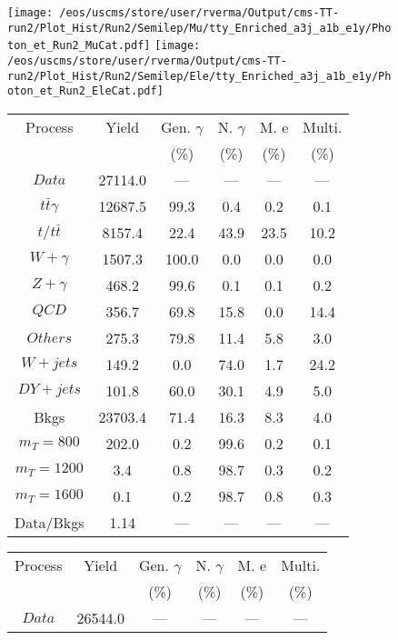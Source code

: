\begin{figure}
\centering
\texttt{[image: /eos/uscms/store/user/rverma/Output/cms-TT-run2/Plot\_Hist/Run2/Semilep/Mu/tty\_Enriched\_a3j\_a1b\_e1y/Photon\_et\_Run2\_MuCat.pdf]}
\texttt{[image: /eos/uscms/store/user/rverma/Output/cms-TT-run2/Plot\_Hist/Run2/Semilep/Ele/tty\_Enriched\_a3j\_a1b\_e1y/Photon\_et\_Run2\_EleCat.pdf]}
\begin{minipage}[c]{0.32\textwidth}
\centering
\tiny{
\begin{tabular}{cccccc}
\hline
Process & Yield & Gen. $\gamma$ & N. $\gamma$ & M. e & Multi. \\
 &  & (\%) & (\%) & (\%) & (\%)  \\
\hline
                                                                      $ Data $ &  27114.0 &  --- &  --- &  --- &  ---\\
$ t\bar{t}\gamma $ &  12687.5 &  99.3 &  0.4 &  0.2 &  0.1\\
$ t/t\bar{t} $ &  8157.4 &  22.4 &  43.9 &  23.5 &  10.2\\
$ W+\gamma $ &  1507.3 &  100.0 &  0.0 &  0.0 &  0.0\\
$ Z+\gamma $ &  468.2 &  99.6 &  0.1 &  0.1 &  0.2\\
$ QCD $ &  356.7 &  69.8 &  15.8 &  0.0 &  14.4\\
$ Others $ &  275.3 &  79.8 &  11.4 &  5.8 &  3.0\\
$ W+jets $ &  149.2 &  0.0 &  74.0 &  1.7 &  24.2\\
$ DY+jets $ &  101.8 &  60.0 &  30.1 &  4.9 &  5.0\\
Bkgs &  23703.4 &  71.4 &  16.3 &  8.3 &  4.0\\
$ m_{T} = 800 $ &  202.0 &  0.2 &  99.6 &  0.2 &  0.1\\
$ m_{T} = 1200 $ &  3.4 &  0.8 &  98.7 &  0.3 &  0.2\\
$ m_{T} = 1600 $ &  0.1 &  0.2 &  98.7 &  0.8 &  0.3\\
Data/Bkgs &  1.14 &  --- &  --- &  --- &  ---\\
\hline
\end{tabular}
}
\end{minipage}
\begin{minipage}[c]{0.32\textwidth}
\centering
\tiny{
\begin{tabular}{cccccc}
\hline
Process & Yield & Gen. $\gamma$ & N. $\gamma$ & M. e & Multi. \\
 &  & (\%) & (\%) & (\%) & (\%)  \\
\hline
                                                                      $ Data $ &  26544.0 &  --- &  --- &  --- &  ---\\

\end{tabular}}
\end{minipage}
\end{figure}
